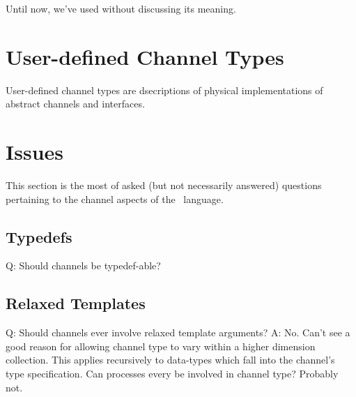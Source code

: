 Until now, we've used  without discussing its meaning.  


\section{User-defined Channel Types}
\label{sec:channels:userdef}

User-defined channel types are dsecriptions of physical implementations
of abstract channels and interfaces.  

\section{Issues}
\label{sec:channels:issues}

This section is the most of asked (but not necessarily answered) questions
pertaining to the channel aspects of the \hac\ language.  

\subsection{Typedefs}
\label{sec:channels:typedefs}

Q: Should channels be typedef-able?

\subsection{Relaxed Templates}
\label{sec:channels:relaxed_templates}

Q: Should channels ever involve relaxed template arguments?
A: No.  Can't see a good reason for allowing channel type to vary
	within a higher dimension collection.  This applies recursively
	to data-types which fall into the channel's type specification.  
	Can processes every be involved in channel type?  Probably not.  

